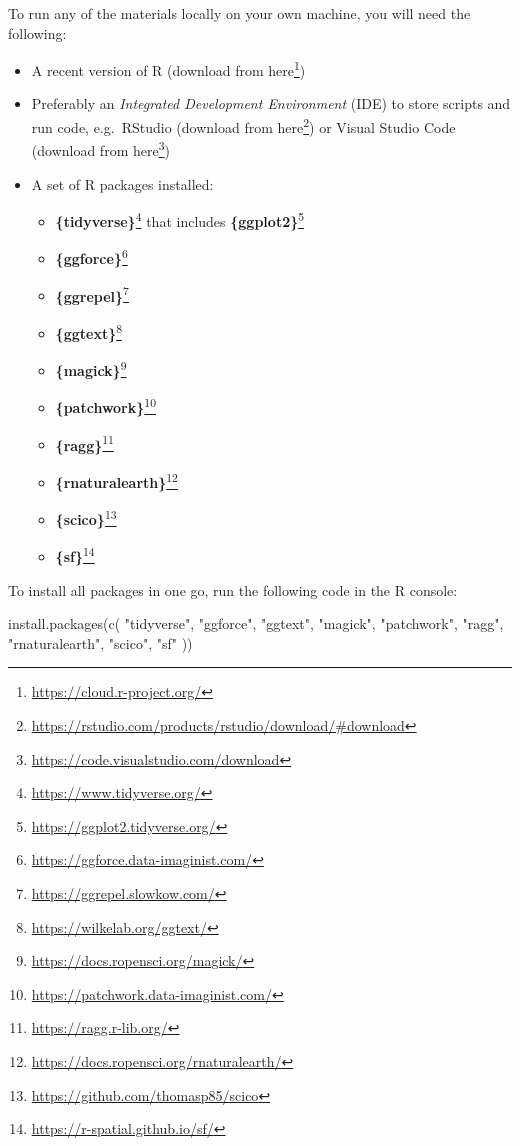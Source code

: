 \documentclass[
]{krantz}
\makeatletter
\newenvironment{Shaded}{\begin{snugshade}}{\end{snugshade}}
\newcommand{\FunctionTok}[1]{\textcolor[rgb]{0,0,0}{#1}}
\newcommand{\NormalTok}[1]{#1}
\newcommand{\StringTok}[1]{\textcolor[rgb]{0.5,0.5,0.5}{#1}}
\providecommand{\tightlist}{%
  \setlength{\itemsep}{0pt}\setlength{\parskip}{0pt}}
\renewcommand{\href}[2]{#2\footnote{\url{#1}}}
\newenvironment{kframe}{%
\medskip{}
\setlength{\fboxsep}{.8em}
 \def\at@end@of@kframe{}%
 \ifinner\ifhmode%
  \def\at@end@of@kframe{\end{minipage}}%
  \begin{minipage}{\columnwidth}%
 \fi\fi%
 \def\FrameCommand##1{\hskip\@totalleftmargin \hskip-\fboxsep
 \colorbox{shadecolor}{##1}\hskip-\fboxsep
     \hskip-\linewidth \hskip-\@totalleftmargin \hskip\columnwidth}%
 \MakeFramed {\advance\hsize-\width
   \@totalleftmargin\z@ \linewidth\hsize
   \@setminipage}}%
 {\par\unskip\endMakeFramed%
 \at@end@of@kframe}
\renewenvironment{Shaded}{\begin{kframe}}{\end{kframe}}
\makeatother
\begin{document}
To run any of the materials locally on your own machine, you will need the following:

\begin{itemize}
\tightlist
\item
  A recent version of R (download from \href{https://cloud.r-project.org/}{here})
\item
  Preferably an \emph{Integrated Development Environment} (IDE) to store scripts and run code, e.g.~RStudio (download from \href{https://rstudio.com/products/rstudio/download/\#download}{here}) or Visual Studio Code (download from \href{https://code.visualstudio.com/download}{here})
\item
  A set of R packages installed:

  \begin{itemize}
  \tightlist
  \item
    \href{https://www.tidyverse.org/}{\textbf{\{tidyverse\}}} that includes \href{https://ggplot2.tidyverse.org/}{\textbf{\{ggplot2\}}}
  \item
    \href{https://ggforce.data-imaginist.com/}{\textbf{\{ggforce\}}}
  \item
    \href{https://ggrepel.slowkow.com/}{\textbf{\{ggrepel\}}}
  \item
    \href{https://wilkelab.org/ggtext/}{\textbf{\{ggtext\}}}
  \item
    \href{https://docs.ropensci.org/magick/}{\textbf{\{magick\}}}
  \item
    \href{https://patchwork.data-imaginist.com/}{\textbf{\{patchwork\}}}
  \item
    \href{https://ragg.r-lib.org/}{\textbf{\{ragg\}}}
  \item
    \href{https://docs.ropensci.org/rnaturalearth/}{\textbf{\{rnaturalearth\}}}
  \item
    \href{https://github.com/thomasp85/scico}{\textbf{\{scico\}}}
  \item
    \href{https://r-spatial.github.io/sf/}{\textbf{\{sf\}}}
  \end{itemize}
\end{itemize}

To install all packages in one go, run the following code in the R console:

\begin{Shaded}
\begin{Highlighting}[]
\FunctionTok{install.packages}\NormalTok{(}\FunctionTok{c}\NormalTok{(}
  \StringTok{"tidyverse"}\NormalTok{, }\StringTok{"ggforce"}\NormalTok{, }\StringTok{"ggtext"}\NormalTok{, }\StringTok{"magick"}\NormalTok{, }\StringTok{"patchwork"}\NormalTok{, }
  \StringTok{"ragg"}\NormalTok{, }\StringTok{"rnaturalearth"}\NormalTok{, }\StringTok{"scico"}\NormalTok{, }\StringTok{"sf"}
\NormalTok{))}
\end{Highlighting}
\end{Shaded}
\end{document}

